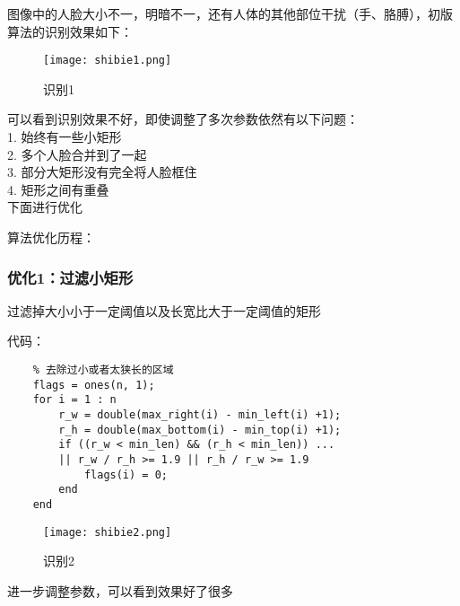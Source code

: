 \documentclass[12pt]{article}
\begin{document}
图像中的人脸大小不一，明暗不一，还有人体的其他部位干扰（手、胳膊），初版算法的识别效果如下：

\begin{figure}[H]
    \centering
    \texttt{[image: shibie1.png]}
    \caption{识别1}
\end{figure}

可以看到识别效果不好，即使调整了多次参数依然有以下问题：\\
\hspace*{2em}1. 始终有一些小矩形 \\
\hspace*{2em}2. 多个人脸合并到了一起\\
\hspace*{2em}3. 部分大矩形没有完全将人脸框住\\
\hspace*{2em}4. 矩形之间有重叠\\
\hspace*{2em}下面进行优化

算法优化历程：

\subsubsection{优化1：过滤小矩形}
过滤掉大小小于一定阈值以及长宽比大于一定阈值的矩形

代码：
\begin{lstlisting}
    % 去除过小或者太狭长的区域
    flags = ones(n, 1);
    for i = 1 : n
        r_w = double(max_right(i) - min_left(i) +1);
        r_h = double(max_bottom(i) - min_top(i) +1);
        if ((r_w < min_len) && (r_h < min_len)) ... 
        || r_w / r_h >= 1.9 || r_h / r_w >= 1.9
            flags(i) = 0;
        end
    end
\end{lstlisting}

\begin{figure}[H]
    \centering
    \texttt{[image: shibie2.png]}
    \caption{识别2}
\end{figure}

进一步调整参数，可以看到效果好了很多
\end{document}
